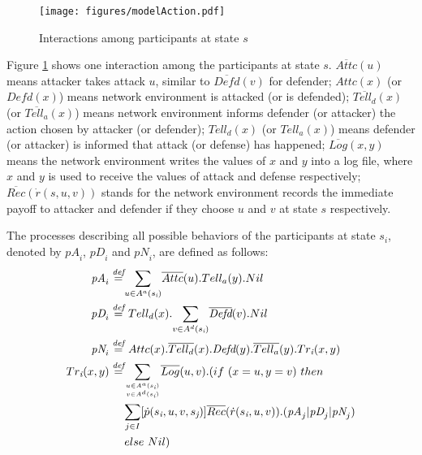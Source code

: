 \documentclass{acm_proc_article-sp}
\begin{document}
\begin{figure}[!htpb]
\begin{center}
\texttt{[image: figures/modelAction.pdf]}
\caption{Interactions among participants at state $s$}
\label{interactions}
\end{center}
\end{figure}
Figure \ref{interactions} shows one interaction among the participants at state $s$. $\overline{Attc}(u)$ means attacker takes attack $u$, similar to $\overline{\textit{Defd}}(v)$ for defender; $Attc(x)$ (or $\textit{Defd}(x)$) means network environment is attacked (or is defended); $\overline{Tell_d}(x)$ (or $\overline{Tell_a}(x)$) means network environment informs defender (or attacker) the action chosen by attacker (or defender); $Tell_d(x)$ (or $Tell_a(x)$) means defender (or attacker) is informed that attack (or defense) has happened; $\overline{Log}(x,y)$ means the network environment writes the values of $x$ and $y$ into a log file, where $x$ and $y$ is used to receive the values of  attack and defense respectively; $\overline{Rec}(\dot{r}(s,u,v))$ stands for the network environment records the immediate payoff to attacker and defender if they choose $u$ and $v$ at state $s$ respectively.

The processes describing all possible behaviors of the participants at state $s_{\textit{i}}$, denoted by $\textit{pA}_{i}$, $\textit{pD}_{i}$ and $\textit{pN}_{i}$, are defined as follows:
\begin{align*}
\textit{pA}_{i}\stackrel{\textit{def}}{=}&\underset{u\in A^a(s_{\textit{i}})}{\sum}\overline{Attc}(u).Tell_a(y).Nil        \\
\textit{pD}_{i}\stackrel{\textit{def}}{=}&~Tell_d(x).\underset{v\in A^d(s_{\textit{i}})}{\sum}\overline{\textit{Defd}}(v).Nil\\
\textit{pN}_{i}\stackrel{\textit{def}}{=}&   ~Attc(x).\overline{Tell_d}(x).\textit{Defd}(y).\overline{Tell_a}(y). Tr_{\textit{i}}(x,y)\\
Tr_{\textit{i}}(x,y)\stackrel{\textit{def}}{=}&\underset{u\in A^a(s_{\textit{i}})\atop v\in A^d(s_{\textit{i}})}{\sum}\overline{Log}(u,v).(if~(x=u,y=v)~ then\\
&\underset{j\in I}{\sum}[\dot{p}(s_{\textit{i}},u,v,s_{\textit{j}})] \overline{Rec}(\dot{r}(s_{\textit{i}},u,v)). (\textit{pA}_j|\textit{pD}_j|\textit{pN}_j)\\
& else~Nil)
\end{align*}
\end{document}
